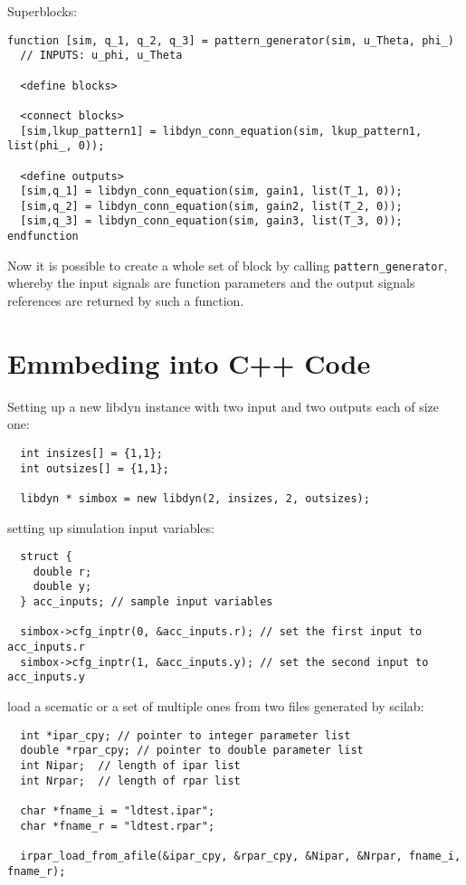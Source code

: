 \documentclass[%
	pdftex,%
	a4paper,%
	oneside,%
	11pt,%
	halfparskip,%
	headsepline,%
	bibtotocnumbered,%
	idxtotoc%
]{scrartcl}
\begin{document}
Superblocks:

\begin{verbatim}
function [sim, q_1, q_2, q_3] = pattern_generator(sim, u_Theta, phi_)
  // INPUTS: u_phi, u_Theta

  <define blocks>
  
  <connect blocks>
  [sim,lkup_pattern1] = libdyn_conn_equation(sim, lkup_pattern1, list(phi_, 0));

  <define outputs>  
  [sim,q_1] = libdyn_conn_equation(sim, gain1, list(T_1, 0));
  [sim,q_2] = libdyn_conn_equation(sim, gain2, list(T_2, 0));
  [sim,q_3] = libdyn_conn_equation(sim, gain3, list(T_3, 0));
endfunction
\end{verbatim}

Now it is possible to create a whole set of block by calling \texttt{pattern\_generator}, whereby the input signals are function parameters and the output signals references are returned by such a function.

\section{Emmbeding into C++ Code}


Setting up a new libdyn instance with two input and two outputs each of size one:

\begin{verbatim}  
  int insizes[] = {1,1};
  int outsizes[] = {1,1};
 
  libdyn * simbox = new libdyn(2, insizes, 2, outsizes);
\end{verbatim}


setting up simulation input variables:

\begin{verbatim}
  struct {
    double r;
    double y;
  } acc_inputs; // sample input variables
  
  simbox->cfg_inptr(0, &acc_inputs.r); // set the first input to acc_inputs.r
  simbox->cfg_inptr(1, &acc_inputs.y); // set the second input to acc_inputs.y
\end{verbatim}

load a scematic or a set of multiple ones from two files generated by scilab:

\begin{verbatim}
  int *ipar_cpy; // pointer to integer parameter list
  double *rpar_cpy; // pointer to double parameter list
  int Nipar;  // length of ipar list
  int Nrpar;  // length of rpar list
    
  char *fname_i = "ldtest.ipar";
  char *fname_r = "ldtest.rpar";
  
  irpar_load_from_afile(&ipar_cpy, &rpar_cpy, &Nipar, &Nrpar, fname_i, fname_r); 
\end{verbatim}
\end{document}
